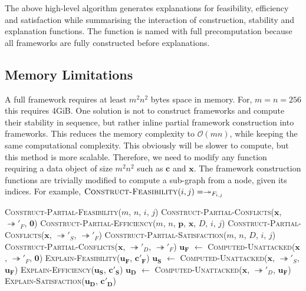 The above high-level algorithm generates explanations for feasibility, efficiency and satisfaction while summarising the interaction of construction, stability and explanation functions. The function is named with full precomputation because all frameworks are fully constructed before explanations.

\subsection{Memory Limitations}

A full framework requires at least $m^2n^2$ bytes space in memory. For, $m=n=256$ this requires 4GiB. One solution is not to construct frameworks and compute their stability in sequence, but rather inline partial framework construction into frameworks. This reduces the memory complexity to $\mathcal{O}(mn)$, while keeping the same computational complexity. This obviously will be slower to compute, but this method is more scalable. Therefore, we need to modify any function requiring a data object of size $m^2n^2$ such as $\mathbf{c}$ and $\mathbf{x}$.
\linespace
The framework construction functions are trivially modified to compute a sub-graph from a node, given its indices. For example, $\textsc{Construct-Feasibility}(i,j)=\twoheadrightarrow_{F_{i,j}}$

\begin{algorithm}[H]
	\caption{}
	\begin{algorithmic}[1]
				\State \Return \textsc{Construct-Partial-Feasibility}($m$, $n$, $i$, $j$)
			\EndFunction
				\State \Return \textsc{Construct-Partial-Conflicts}($\mathbf{x}$, $\twoheadrightarrow'_F$, $\mathbf{0}$)
			\EndFunction
				\State \Return \textsc{Construct-Partial-Efficiency}($m$, $n$, $\mathbf{p}$, $\mathbf{x}$, $D$, $i$, $j$)
			\EndFunction
				\State \Return \textsc{Construct-Partial-Conflicts}($\mathbf{x}$, $\twoheadrightarrow'_S$, $\twoheadrightarrow'_F$)
			\EndFunction
				\State \Return \textsc{Construct-Partial-Satisfaction}($m$, $n$, $D$, $i$, $j$)
			\EndFunction
				\State \Return \textsc{Construct-Partial-Conflicts}($\mathbf{x}$, $\twoheadrightarrow'_D$, $\twoheadrightarrow'_F$)
			\EndFunction
			\State $\mathbf{u_F}$ $\gets$ \textsc{Computed-Unattacked}($\mathbf{x}$, $\twoheadrightarrow'_F$, $\mathbf{0}$)
			\State \textsc{Explain-Feasibility}($\mathbf{u_F}$, $\mathbf{c'_F}$)
			\State $\mathbf{u_S}$ $\gets$ \textsc{Computed-Unattacked}($\mathbf{x}$, $\twoheadrightarrow'_S$, $\mathbf{u_F}$)
			\State \textsc{Explain-Efficiency}($\mathbf{u_S}$, $\mathbf{c'_S}$)
			\State $\mathbf{u_D}$ $\gets$ \textsc{Computed-Unattacked}($\mathbf{x}$, $\twoheadrightarrow'_D$, $\mathbf{u_F}$)
			\State \textsc{Explain-Satisfaction}($\mathbf{u_D}$, $\mathbf{c'_D}$)
		\EndFunction
	\end{algorithmic}
\end{algorithm}

